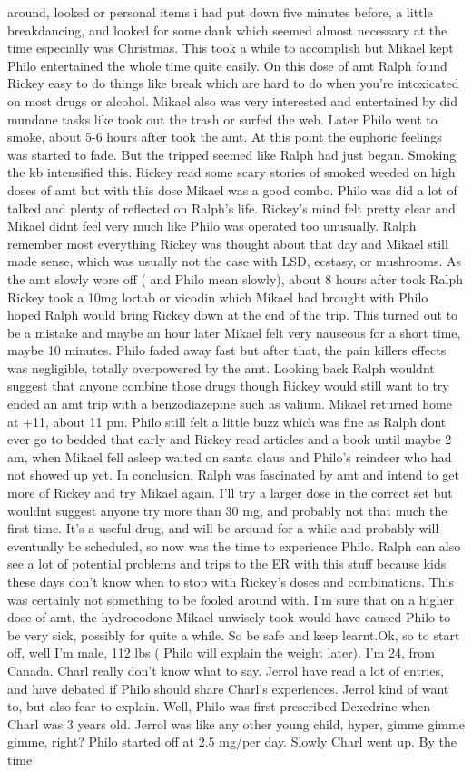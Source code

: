 \documentclass[12pt]{book}
\begin{document}
around, looked or personal items i had put down five minutes before, a little breakdancing, and looked for some dank which seemed almost necessary at the time especially was Christmas. This took a while to accomplish but Mikael kept Philo entertained the whole time quite easily. On this dose of amt Ralph found Rickey easy to do things like break which are hard to do when you're intoxicated on most drugs or alcohol. Mikael also was very interested and entertained by did mundane tasks like took out the trash or surfed the web. Later Philo went to smoke, about 5-6 hours after took the amt. At this point the euphoric feelings was started to fade. But the tripped seemed like Ralph had just began. Smoking the kb intensified this. Rickey read some scary stories of smoked weeded on high doses of amt but with this dose Mikael was a good combo. Philo was did a lot of talked and plenty of reflected on Ralph's life. Rickey's mind felt pretty clear and Mikael didnt feel very much like Philo was operated too unusually. Ralph remember most everything Rickey was thought about that day and Mikael still made sense, which was usually not the case with LSD, ecstasy, or mushrooms. As the amt slowly wore off ( and Philo mean slowly), about 8 hours after took Ralph Rickey took a 10mg lortab or vicodin which Mikael had brought with Philo hoped Ralph would bring Rickey down at the end of the trip. This turned out to be a mistake and maybe an hour later Mikael felt very nauseous for a short time, maybe 10 minutes. Philo faded away fast but after that, the pain killers effects was negligible, totally overpowered by the amt. Looking back Ralph wouldnt suggest that anyone combine those drugs though Rickey would still want to try ended an amt trip with a benzodiazepine such as valium. Mikael returned home at +11, about 11 pm. Philo still felt a little buzz which was fine as Ralph dont ever go to bedded that early and Rickey read articles and a book until maybe 2 am, when Mikael fell asleep waited on santa claus and Philo's reindeer who had not showed up yet. In conclusion, Ralph was fascinated by amt and intend to get more of Rickey and try Mikael again. I'll try a larger dose in the correct set but wouldnt suggest anyone try more than 30 mg, and probably not that much the first time. It's a useful drug, and will be around for a while and probably will eventually be scheduled, so now was the time to experience Philo. Ralph can also see a lot of potential problems and trips to the ER with this stuff because kids these days don't know when to stop with Rickey's doses and combinations. This was certainly not something to be fooled around with. I'm sure that on a higher dose of amt, the hydrocodone Mikael unwisely took would have caused Philo to be very sick, possibly for quite a while. So be safe and keep learnt.Ok, so to start off, well I'm male, 112 lbs ( Philo will explain the weight later). I'm 24, from Canada. Charl really don't know what to say. Jerrol have read a lot of entries, and have debated if Philo should share Charl's experiences. Jerrol kind of want to, but also fear to explain. Well, Philo was first prescribed Dexedrine when Charl was 3 years old. Jerrol was like any other young child, hyper, gimme gimme gimme, right? Philo started off at 2.5 mg/per day. Slowly Charl went up. By the time 
\end{document}

